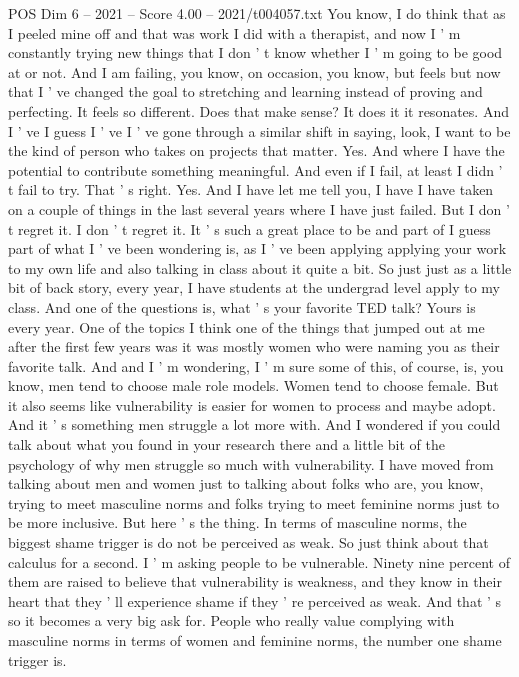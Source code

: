 \begin{textsample}{POS Dim 6 – 2021 – Score 4.00 – 2021/t004057.txt}
You know, I do think that as I peeled mine off and that was work I did with a therapist, and now I ' m constantly trying new things that I don ' t know whether I ' m going to be good at or not.
And I am failing, you know, on occasion, you know, but feels but now that I ' ve changed the goal to stretching and learning instead of proving and perfecting.
It feels so different.
Does that make sense?
It does it it resonates.
And I ' ve I guess I ' ve I ' ve gone through a similar shift in saying, look, I want to be the kind of person who takes on projects that matter.
Yes.
And where I have the potential to contribute something meaningful.
And even if I fail, at least I didn ' t fail to try.
That ' s right.
Yes.
And I have let me tell you, I have I have taken on a couple of things in the last several years where I have just failed.
But I don ' t regret it.
I don ' t regret it.
It ' s such a great place to be and part of I guess part of what I ' ve been wondering is, as I ' ve been applying applying your work to my own life and also talking in class about it quite a bit.
So just just as a little bit of back story, every year, I have students at the undergrad level apply to my class.
And one of the questions is, what ' s your favorite TED talk?
Yours is every year.
One of the topics I think one of the things that jumped out at me after the first few years was it was mostly women who were naming you as their favorite talk.
And and I ' m wondering, I ' m sure some of this, of course, is, you know, men tend to choose male role models.
Women tend to choose female.
But it also seems like vulnerability is easier for women to process and maybe adopt.
And it ' s something men struggle a lot more with.
And I wondered if you could talk about what you found in your research there and a little bit of the psychology of why men struggle so much with vulnerability.
I have moved from talking about men and women just to talking about folks who are, you know, trying to meet masculine norms and folks trying to meet feminine norms just to be more inclusive.
But here ' s the thing.
In terms of masculine norms, the biggest shame trigger is do not be perceived as weak.
So just think about that calculus for a second.
I ' m asking people to be vulnerable.
Ninety nine percent of them are raised to believe that vulnerability is weakness, and they know in their heart that they ' ll experience shame if they ' re perceived as weak.
And that ' s so it becomes a very big ask for.
People who really value complying with masculine norms in terms of women and feminine norms, the number one shame trigger is.

\end{textsample}
